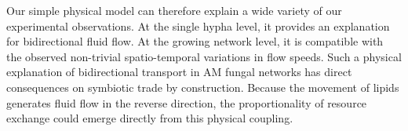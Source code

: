 
Our simple physical model can therefore explain a wide variety of our experimental observations.
At the single hypha level, it provides an explanation for bidirectional fluid flow.
At the growing network level, it is compatible with the observed non-trivial spatio-temporal variations in flow speeds.
Such a physical explanation of bidirectional transport in AM fungal networks has direct consequences on symbiotic trade by construction.
Because the movement of lipids generates fluid flow in the reverse direction, the proportionality of resource exchange could emerge directly from this physical coupling. 

